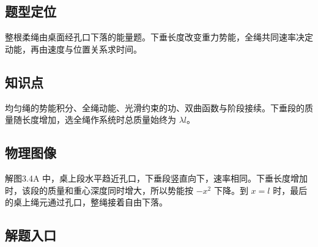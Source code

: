 \documentclass[UTF8,fontset=fandol,a4paper,11pt]{ctexart}
\newcommand{\figcaption}[1]{\par\vspace{2pt}{\small\color{muted}#1}\par}
\begin{document}
\begin{center}\begin{minipage}{\linewidth}\centering{}
\figcaption{图 3.4\quad 向下量取下垂长度。}
\end{minipage}\end{center}



\subsection*{题型定位}

整根柔绳由桌面经孔口下落的能量题。下垂长度改变重力势能，全绳共同速率决定动能，再由速度与位置关系求时间。



\subsection*{知识点}

均匀绳的势能积分、全绳动能、光滑约束的功、双曲函数与阶段接续。下垂段的质量随长度增加，选全绳作系统时总质量始终为 $\lambda l$。




\subsection*{物理图像}

解图3.4A 中，桌上段水平趋近孔口，下垂段竖直向下，速率相同。下垂长度增加时，该段的质量和重心深度同时增大，所以势能按 $-x^2$ 下降。到 $x=l$ 时，最后的桌上绳元通过孔口，整绳接着自由下落。



\subsection*{解题入口}
\end{document}
